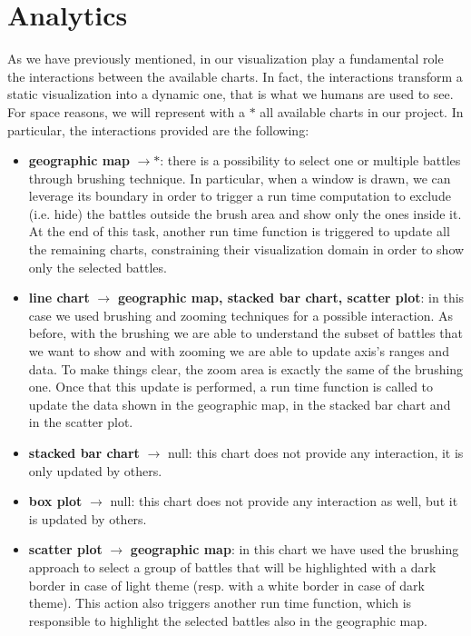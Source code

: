 \section{Analytics}
As we have previously mentioned, in our visualization play a fundamental role the interactions between the available charts. In fact, the interactions transform a static visualization into a dynamic one, that is what we humans are used to see. For space reasons, we will represent with a $*$ all available charts in our project. In particular, the interactions provided are the following:
\begin{itemize}
    \item \textbf{geographic map} $\rightarrow *$: there is a possibility to select one or multiple battles through brushing technique. In particular, when a window is drawn, we can leverage its boundary in order to trigger a run time computation to exclude (i.e. hide) the battles outside the brush area and show only the ones inside it. At the end of this task, another run time function is triggered to update all the remaining charts, constraining their visualization domain in order to show only the selected battles.
    \item \textbf{line chart} $\rightarrow$ \textbf{geographic map, stacked bar chart, scatter plot}: in this case we used brushing and zooming techniques for a possible interaction. As before, with the brushing we are able to understand the subset of battles that we want to show and with zooming we are able to update axis's ranges and data. To make things clear, the zoom area is exactly the same of the brushing one. Once that this update is performed, a run time function is called to update the data shown in the geographic map, in the stacked bar chart and in the scatter plot.
    \item \textbf{stacked bar chart} $\rightarrow$ null: this chart does not provide any interaction, it is only updated by others.
    \item \textbf{box plot} $\rightarrow$ null: this chart does not provide any interaction as well, but it is updated by others.
    \item \textbf{scatter plot} $\rightarrow$ \textbf{geographic map}: in this chart we have used the brushing approach to select a group of battles that will be highlighted with a dark border in case of light theme (resp. with a white border in case of dark theme). This action also triggers another run time function, which is responsible to highlight the selected battles also in the geographic map. 
\end{itemize}